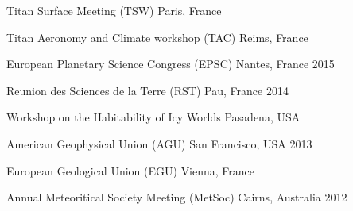 \begin{cvhonors}
  \cvhonor
    {Titan Surface Meeting (TSW)}
    {}
    {Paris, France}
    {}

    \cvhonor
    {Titan Aeronomy and Climate workshop (TAC)}
    {}
    {Reims, France}
    {}

  \cvhonor
    {European Planetary Science Congress (EPSC)}
    {}
    {Nantes, France}
    {2015}

  \cvhonor
    {Reunion des Sciences de la Terre (RST)}
    {}
    {Pau, France}
    {2014}

  \cvhonor
    {Workshop on the Habitability of Icy Worlds}
    {}
    {Pasadena, USA}
    {}

  \cvhonor
    {American Geophysical Union (AGU)}
    {}
    {San Francisco, USA}
    {2013}

  \cvhonor
    {European Geological Union (EGU)}
    {}
    {Vienna, France}
    {}

  \cvhonor
    {Annual Meteoritical Society Meeting (MetSoc)}
    {}
    {Cairns, Australia}
    {2012}


\end{cvhonors}
